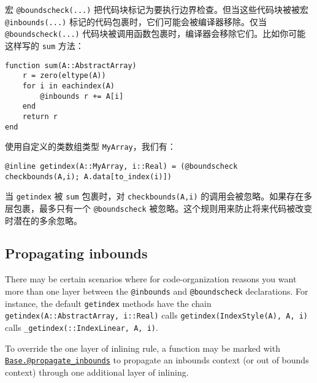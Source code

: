 宏 \texttt{@boundscheck(...)} 把代码块标记为要执行边界检查。但当这些代码块被被宏 \texttt{@inbounds(...)} 标记的代码包裹时，它们可能会被编译器移除。仅当\texttt{@boundscheck(...)} 代码块被调用函数包裹时，编译器会移除它们。比如你可能这样写的 \texttt{sum} 方法：




\begin{verbatim}
function sum(A::AbstractArray)
    r = zero(eltype(A))
    for i in eachindex(A)
        @inbounds r += A[i]
    end
    return r
end
\end{verbatim}



使用自定义的类数组类型 \texttt{MyArray}，我们有：




\begin{verbatim}
@inline getindex(A::MyArray, i::Real) = (@boundscheck checkbounds(A,i); A.data[to_index(i)])
\end{verbatim}



当 \texttt{getindex} 被 \texttt{sum} 包裹时，对 \texttt{checkbounds(A,i)} 的调用会被忽略。如果存在多层包裹，最多只有一个 \texttt{@boundscheck} 被忽略。这个规则用来防止将来代码被改变时潜在的多余忽略。



\hypertarget{10208484018202603417}{}


\subsection{Propagating inbounds}



There may be certain scenarios where for code-organization reasons you want more than one layer between the \texttt{@inbounds} and \texttt{@boundscheck} declarations. For instance, the default \texttt{getindex} methods have the chain \texttt{getindex(A::AbstractArray, i::Real)} calls \texttt{getindex(IndexStyle(A), A, i)} calls \texttt{\_getindex(::IndexLinear, A, i)}.



To override the {\textquotedbl}one layer of inlining{\textquotedbl} rule, a function may be marked with \hyperlink{4942611866585954207}{\texttt{Base.@propagate\_inbounds}} to propagate an inbounds context (or out of bounds context) through one additional layer of inlining.



\hypertarget{17261866997775737461}{}


